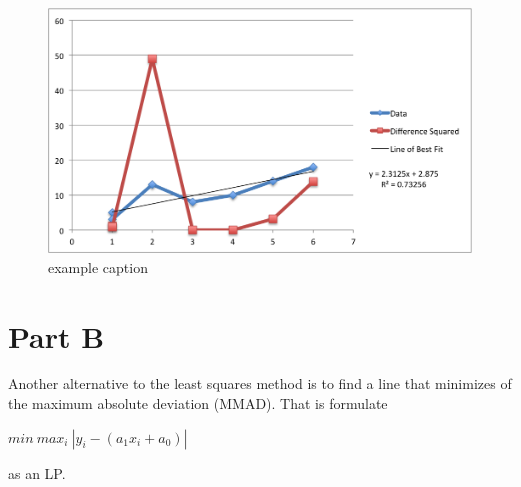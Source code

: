 \begin{figure}[h] %
   \centering
   \includegraphics[width=\textwidth,height=\textheight,keepaspectratio]{Q3PAiii.png} 
   \caption{example caption}
   \label{fig:example}
\end{figure}
%

\section{Part B}
Another alternative to the least squares method is to find a line that minimizes of the maximum absolute deviation (MMAD). That is formulate
\begin{center} $min\  max_{i}\  | y_{i}  - (a_{1}x_{i} + a_{0}) |$ \end{center}
as an LP.

